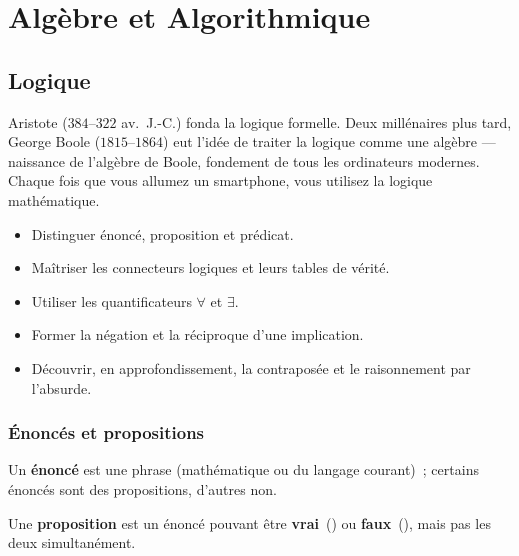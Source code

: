 \part{Alg\`ebre et Algorithmique}

\chapter{Logique}
\label{chap:logique}


\begin{anecdote}
Aristote ($384$--$322$ av.\ J.-C.) fonda la logique formelle. Deux mill\'enaires plus
tard, George Boole ($1815$--$1864$) eut l'id\'ee de traiter la logique comme une
alg\`ebre --- naissance de l'alg\`ebre de Boole, fondement de tous les ordinateurs
modernes. Chaque fois que vous allumez un smartphone, vous utilisez la logique
math\'ematique.
\end{anecdote}

\begin{objectifs}
\begin{itemize}
  \item Distinguer \'enonc\'e, proposition et pr\'edicat.
  \item Ma\^itriser les connecteurs logiques et leurs tables de v\'erit\'e.
  \item Utiliser les quantificateurs $\forall$ et $\exists$.
  \item Former la n\'egation et la r\'eciproque d'une implication.
  \item D\'ecouvrir, en approfondissement, la contrapos\'ee et le raisonnement par l'absurde.
\end{itemize}
\end{objectifs}

\section{\'Enonc\'es et propositions}

Un \textbf{\'enonc\'e} est une phrase (math\'ematique ou du langage courant)~;
certains \'enonc\'es sont des propositions, d'autres non.

\begin{defn}[Proposition]
Une \textbf{proposition} est un \'enonc\'e pouvant \^etre \textbf{vrai}~(\vrai)
ou \textbf{faux}~(\faux), mais pas les deux simultan\'ement.
\end{defn}

